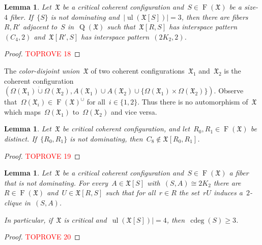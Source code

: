\documentclass[english,a4paper]{article}
\theoremstyle{plain}
\newtheorem{lemma}      [theorem]{Lemma}
\theoremstyle{definition}
\newcommand{\disjointUnion}{\ensuremath{\mathbin{\dot{\cup}}}}
\DeclareMathOperator{\Fibers}{F}
\newcommand{\coherentConfig}{\ensuremath{\mathfrak{X}}}
\newcommand{\fibers}[1]{\ensuremath{\Fibers \left( #1 \right)}}
\newcommand{\interspace}[2]{\ensuremath{\coherentConfig[#1,#2]}}
\newcommand{\inducedCC}[1]{\ensuremath{\coherentConfig[#1]}}
\DeclareMathOperator*{\ul}{ul}
\newcommand{\vertices}{\ensuremath{\Omega}}
\newcommand{\arcs}{\ensuremath{A}}
\DeclareMathOperator*{\Quotient}{Q}
\newcommand{\quotientGraph}[1]{\ensuremath{\Quotient(#1)}}
\DeclareMathOperator{\ColorDeg}{cdeg}
\newcommand{\colorDeg}[1]{\ensuremath{\ColorDeg\left(#1\right)}}
\newcommand{\ipfourMatching}{\ensuremath{(\disjointCliques{2}{2},2)}}
\newcommand{\ipfourCycle}   {\ensuremath{(\cycle{4},2)}}
\newcommand{\clique}[1]{\ensuremath{K_{#1}}}
\newcommand{\cycle}[1]{\ensuremath{C_{#1}}}
\newcommand{\disjointCliques}[2]{\ensuremath{#1 \clique{#2}}}
\begin{document}
\begin{lemma}
    \label{critical:4cc:restorable:2,C4/lem}
    Let~$\coherentConfig$ be a critical coherent configuration and~$S \in \fibers{\coherentConfig}$ be a size-$4$ fiber.
    If~$\{S\}$ is not dominating and~$|\ul(\inducedCC{S})| = 3$, then there are fibers~$R,R'$ adjacent to~$S$ in~$\quotientGraph{\coherentConfig}$ such that~$\interspace{R}{S}$ has interspace pattern~$\ipfourCycle$ and~$\interspace{R'}{S}$ has interspace pattern~$\ipfourMatching$.
\end{lemma}
\begin{proof}\textcolor{red}{TOPROVE 18}\end{proof}


The \emph{color-disjoint union~$\coherentConfig$} of two coherent configurations~$\coherentConfig_1$ and~$\coherentConfig_2$ is the coherent configuration~$(\vertices(\coherentConfig_1) \disjointUnion \vertices(\coherentConfig_2), \arcs(\coherentConfig_1) \cup \arcs(\coherentConfig_2) \cup \{\vertices(\coherentConfig_1) \times \vertices(\coherentConfig_2)\})$.
Observe that~$\vertices(\coherentConfig_i) \in \fibers{\coherentConfig}^\cup$ for all~$i \in \{1,2\}$.
Thus there is no automorphism of~$\coherentConfig$ which maps~$\vertices(\coherentConfig_1)$ to~$\vertices(\coherentConfig_2)$ and vice versa.


\begin{lemma}
\label{critical:4cc:restorable:cycle/lem}
    Let~$\coherentConfig$ be critical coherent configuration, and let~$R_0,R_1 \in \fibers{\coherentConfig}$ be distinct.
    If~$\{R_0 , R_1\}$ is not dominating, then~$\cycle{8} \notin \interspace{R_0}{R_1}$.
\end{lemma}
\begin{proof}\textcolor{red}{TOPROVE 19}\end{proof}


\begin{lemma}
\label{critical:4-cc:restorable:DUC/lem}
    Let~$\coherentConfig$ be a critical coherent configuration and~$S \in \fibers{\coherentConfig}$ a fiber that is not dominating.
    For every~$\arcs \in \inducedCC{S}$ with~$(S,\arcs) \cong \disjointCliques{2}{2}$ there are~$R \in \fibers{\coherentConfig}$ and~$U \in \interspace{R}{S}$ such that for all~$r \in R$ the set~$r U$ induces a~$2$-clique in~$(S,\arcs)$.

    In particular, if~$\coherentConfig$ is critical and~$\ul(\inducedCC{S})| = 4$, then~$\colorDeg{S} \geq 3$.
\end{lemma}
\begin{proof}\textcolor{red}{TOPROVE 20}\end{proof}
\end{document}
